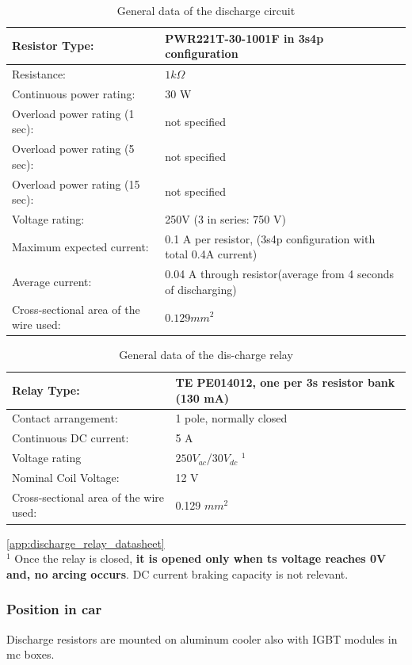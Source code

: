 \begin{table}[H]
	\centering
	\caption{General data of the discharge circuit}
	\begin{tabularx}{\textwidth}{|X|X|}
		\hline
		Resistor Type: & PWR221T-30-1001F in 3s4p configuration \\[\TableSize]
		\hline
		Resistance: & $1 k\Omega$ \\[\TableSize]
		\hline
		Continuous power rating: & 30 W \\[\TableSize]
		\hline
		Overload power rating (1 sec): & not specified \\[\TableSize]
		\hline
		Overload power rating (5 sec): & not specified \\[\TableSize]
		\hline
		Overload power rating (15 sec): & not specified \\[\TableSize]
		\hline
		Voltage rating: & 250V (3 in series: 750 V) \\[\TableSize]
		\hline
		Maximum expected current: & 0.1 A per resistor, (3s4p configuration with total 0.4A current) \\[\TableSize]
		\hline
		Average current: & 0.04 A through resistor(average from 4 seconds of discharging) \\[\TableSize]
		\hline
		Cross-sectional area of the wire used: & $0.129 mm^2$ \\[\TableSize]
		\hline
	\end{tabularx}%
	\label{tab:dischrage-circ}%
\end{table}%

\begin{table}[H]
	\centering
	\caption{General data of the dis-charge relay}
	\begin{tabularx}{\textwidth}{|X|X|}
		\hline
		Relay Type: & TE PE014012, one per 3s resistor bank (130 mA)\\[\TableSize]
		\hline
		Contact arrangement: & 1 pole, normally closed  \\[\TableSize]
		\hline
		Continuous DC current: & 5 A \\[\TableSize]
		\hline
		Voltage rating  & $250 V_{ac}$/$30 V_{dc}$ $^1$ \\[\TableSize]
		\hline
		Nominal Coil Voltage:  & 12 V\\[\TableSize]
		\hline
		Cross-sectional area of the wire used: & 0.129 $mm^2$ \\[\TableSize]
		\hline
	\end{tabularx}%
	\label{tab:discharge-relay}%
\end{table}%

\ref{app:discharge_relay_datasheet}
\\
$^1$ Once the relay is closed, \textbf{it is opened only when \gls{ts} voltage reaches 0V and, no arcing occurs}. DC current braking capacity is not relevant.


\subsubsection{Position in car}

Discharge resistors are mounted on aluminum cooler also with IGBT modules in \gls{mc} boxes.